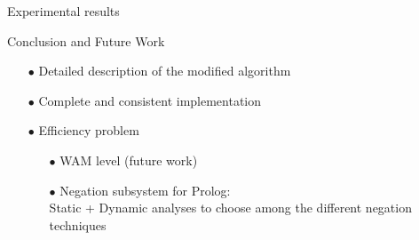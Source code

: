 \documentclass[pdf,slideColor,contemporain]{prosper}
\begin{document}

\begin{slide}{Experimental results}
\vspace{-0.2cm}
 
\begin{tiny}
 
\end{tiny}

\end{slide}


\begin{slide}{Conclusion and Future Work}

\vspace{1cm}
        \begin{itemize}
                \item[{\blue $\bullet$}] Detailed description of the modified {\blue algorithm}
                \item[{\blue $\bullet$}] Complete and consistent {\blue implementation}
                \item[$\bullet$] {\blue Efficiency} problem
                  \begin{itemize}
                  \item[{\blue $\bullet$}] WAM level (future work)
                  \item[{\blue $\bullet$}] Negation subsystem for Prolog: \\
                    Static + Dynamic analyses to choose among the different negation techniques
                  \end{itemize}
        \end{itemize}
\end{slide}


\end{document}
